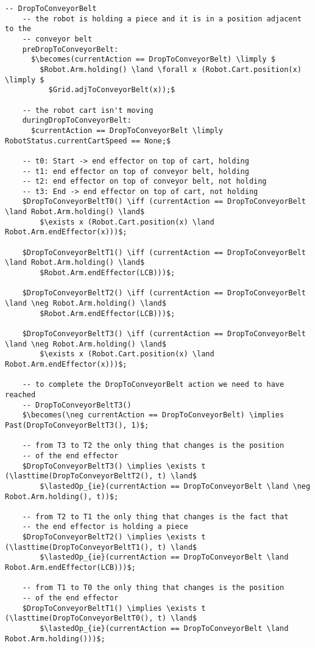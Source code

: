 \begin{lstlisting}[fontadjust, mathescape, frame=single]
  -- DropToConveyorBelt
    -- the robot is holding a piece and it is in a position adjacent to the 
    -- conveyor belt
    preDropToConveyorBelt:
      $\becomes(currentAction == DropToConveyorBelt) \limply $
        $Robot.Arm.holding() \land \forall x (Robot.Cart.position(x) \limply $
          $Grid.adjToConveyorBelt(x));$
    
    -- the robot cart isn't moving
    duringDropToConveyorBelt:
      $currentAction == DropToConveyorBelt \limply RobotStatus.currentCartSpeed == None;$

    -- t0: Start -> end effector on top of cart, holding
    -- t1: end effector on top of conveyor belt, holding
    -- t2: end effector on top of conveyor belt, not holding
    -- t3: End -> end effector on top of cart, not holding
    $DropToConveyorBeltT0() \iff (currentAction == DropToConveyorBelt \land Robot.Arm.holding() \land$
        $\exists x (Robot.Cart.position(x) \land Robot.Arm.endEffector(x)))$;
    
    $DropToConveyorBeltT1() \iff (currentAction == DropToConveyorBelt \land Robot.Arm.holding() \land$
        $Robot.Arm.endEffector(LCB)))$;
    
    $DropToConveyorBeltT2() \iff (currentAction == DropToConveyorBelt \land \neg Robot.Arm.holding() \land$
        $Robot.Arm.endEffector(LCB)))$;
    
    $DropToConveyorBeltT3() \iff (currentAction == DropToConveyorBelt \land \neg Robot.Arm.holding() \land$
        $\exists x (Robot.Cart.position(x) \land Robot.Arm.endEffector(x)))$;
    
    -- to complete the DropToConveyorBelt action we need to have reached
    -- DropToConveyorBeltT3()
    $\becomes(\neg currentAction == DropToConveyorBelt) \implies Past(DropToConveyorBeltT3(), 1)$;
    
    -- from T3 to T2 the only thing that changes is the position
    -- of the end effector
    $DropToConveyorBeltT3() \implies \exists t (\lasttime(DropToConveyorBeltT2(), t) \land$
        $\lastedOp_{ie}(currentAction == DropToConveyorBelt \land \neg Robot.Arm.holding(), t))$;

    -- from T2 to T1 the only thing that changes is the fact that
    -- the end effector is holding a piece
    $DropToConveyorBeltT2() \implies \exists t (\lasttime(DropToConveyorBeltT1(), t) \land$
        $\lastedOp_{ie}(currentAction == DropToConveyorBelt \land Robot.Arm.endEffector(LCB)))$;
    
    -- from T1 to T0 the only thing that changes is the position
    -- of the end effector
    $DropToConveyorBeltT1() \implies \exists t (\lasttime(DropToConveyorBeltT0(), t) \land$
        $\lastedOp_{ie}(currentAction == DropToConveyorBelt \land Robot.Arm.holding()))$;


\end{lstlisting}

